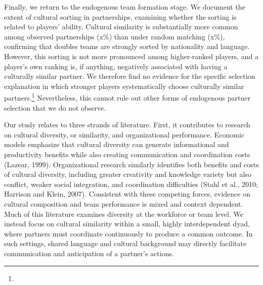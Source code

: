 \documentclass[10pt]{article}
\begin{document}
Finally, we return to the endogenous team formation stage. We document the extent of cultural sorting in partnerships, examining whether the sorting is related to  players' ability. Cultural similarity is substantially more common among observed partnerships (x\%) than under random matching (x\%), confirming that doubles teams are strongly sorted by nationality and language. However, this sorting is not more pronounced among higher-ranked players, and a player's own ranking is, if anything, negatively associated with having a culturally similar partner. We therefore find no evidence for the specific selection explanation in which stronger players systematically choose culturally similar partners.\footnote{} Nevertheless, this  cannot rule out other forms of endogenous partner selection that we do not observe.

Our study relates to three strands of literature. First, it contributes to research on cultural diversity, or similarity, and organizational performance. Economic models emphasize that cultural diversity can generate informational and productivity benefits while also creating communication and coordination costs (Lazear, 1999). Organizational research similarly identifies both benefits and costs of cultural diversity, including greater creativity and knowledge variety but also conflict, weaker social integration, and coordination difficulties (Stahl et al., 2010; Harrison and Klein, 2007). Consistent with these competing forces, evidence on cultural composition and team performance is mixed and context dependent. Much of this literature examines diversity at the workforce or team level. We instead focus on cultural similarity within a small, highly interdependent dyad, where partners must coordinate continuously to produce a common outcome. In such settings, shared language and cultural background may directly facilitate communication and anticipation of a partner’s actions.
\end{document}
